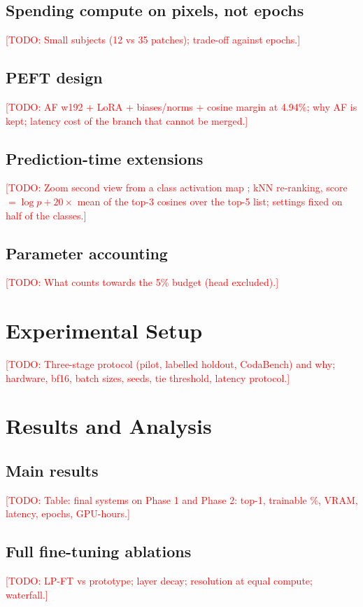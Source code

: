 \documentclass{article} %
\newcommand{\todo}[1]{\textcolor{red}{[TODO: #1]}}
\begin{document}
\subsection{Spending compute on pixels, not epochs}
\todo{Small subjects (12 vs 35 patches); trade-off against epochs.}

\subsection{PEFT design}
\todo{AF w192 + LoRA + biases/norms + cosine margin at 4.94\%; why AF is kept;
latency cost of the branch that cannot be merged.}

\subsection{Prediction-time extensions}
\todo{Zoom second view from a class activation map \citep{zhou2016cam}; kNN re-ranking, score $= \log p + 20 \times$ mean of the
top-3 cosines over the top-5 list; settings fixed on half of the classes.}

\subsection{Parameter accounting}
\todo{What counts towards the 5\% budget (head excluded).}

\section{Experimental Setup}
\label{sec:setup}
\todo{Three-stage protocol (pilot, labelled holdout, CodaBench) and why; hardware,
bf16, batch sizes, seeds, tie threshold, latency protocol.}

\section{Results and Analysis}
\label{sec:results}

\subsection{Main results}
\todo{Table: final systems on Phase 1 and Phase 2: top-1, trainable \%, VRAM,
latency, epochs, GPU-hours.}

\subsection{Full fine-tuning ablations}
\todo{LP-FT vs prototype; layer decay; resolution at equal compute; waterfall.}
\end{document}
